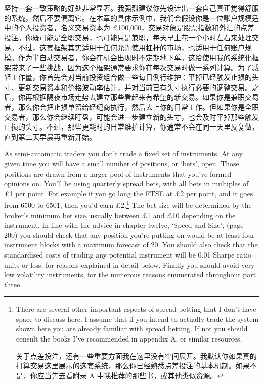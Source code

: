 \begin{chineseblock}坚持一套一致策略的好处非常显著。我强烈建议你先设计出一套自己真正觉得舒服的系统，然后不要偏离它。在本章的具体示例中，我们会假设你是一位账户规模适中的个人投资者，名义交易资本为 £100,000，交易对象是股票指数和外汇的点差投注。你既可能是全职交易，也可能只是兼职，每天早上花一个小时左右来处理交易。不过，这套框架其实适用于任何允许使用杠杆的市场，也适用于任何账户规模。作为半自动交易者，你会在机会出现时不定期地下单。这给使用我的系统化框架带来了一些挑战，因为这个框架通常要求你在每次交易时做一系列计算。为了减轻工作量，你首先会对当前投资组合做一些每日例行维护：平掉已经触发止损的头寸、更新交易资本和价格波动率估计，并对当前已有头寸执行必要的调整交易。之后，你再根据隔夜市场走势去建立那些看起来有希望的新交易。如果你是兼职交易者，那么你会把止损单留给经纪商执行，然后去上你的日常工作。但如果你是全职交易者，那么你会继续盯盘，可能会进一步建立新的头寸，也会及时平掉那些触发止损的头寸。不过，那些更耗时的日常维护计算，你通常不会在同一天里反复做，直到第二天早晨再重新开始。\end{chineseblock}



\begin{englishblock} As semi-automatic traders you don't trade a fixed set of instruments. At any given time you will have a small number of positions, or ‘bets', open. Those positions are drawn from a larger pool of instruments that you've formed opinions on. You'll be using quarterly spread bets, with all bets in multiples of £1 per point. For example if you go long the FTSE at £2 per point, and it goes from 6500 to 6501, then you'd earn £2.\footnote{There are several other important aspects of spread betting that I don't have space to discuss here. I assume that if you intend to actually trade the system shown here you are already familiar with spread betting. If not you should consult the books I've recommended in appendix A, or similar resources. \par 关于点差投注，还有一些重要方面我在这里没有空间展开。我默认你如果真的打算交易这里展示的这套系统，那么你已经熟悉点差投注的基本机制。如果不是，你应当先去看附录 A 中我推荐的那些书，或其他类似资源。} The bet size will be determined by the broker's minimum bet size, usually between £1 and £10 depending on the instrument. In line with the advice in chapter twelve, ‘Speed and Size', (page 200) you should check that any position you're putting on would be at least four instrument blocks with a maximum forecast of 20. You should also check that the standardised costs of trading any potential instrument will be 0.01 Sharpe ratio units or less, for reasons explained in detail below. Finally you should avoid very low volatility instruments, for the numerous reasons enumerated throughout part three. \end{englishblock}

